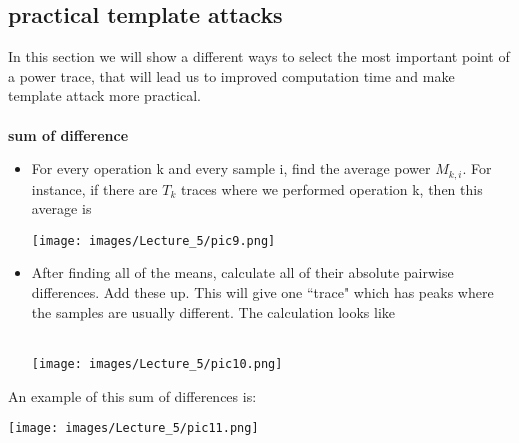     \subsection{practical template attacks}
    In this section we will show a different ways to select the most important
    point of a power trace, that will lead us to improved computation time and
    make template attack more practical.\\
    \\
    \textbf{sum of difference}
       \begin{itemize}
          \item For every operation k and every sample i, find the average power
          $M_{k, i}$. For instance, if there are $T_k$ traces where we performed
          operation k, then this average is\\
              \begin{minipage}{\linewidth}
              \centering
              \texttt{[image: images/Lecture\_5/pic9.png]}
              \end{minipage}
           
          \item After finding all of the means, calculate all of their absolute
          pairwise differences. Add these up. This will give one ``trace" which
          has peaks where the samples are usually different. The calculation
          looks like\\
          \\
              \begin{minipage}{\linewidth}
              \centering
              \texttt{[image: images/Lecture\_5/pic10.png]}
              \end{minipage}
       \end{itemize}
        An example of this sum of differences is:\\
              \begin{minipage}{\linewidth}
              \centering
              \texttt{[image: images/Lecture\_5/pic11.png]}
              \end{minipage}
        \\

